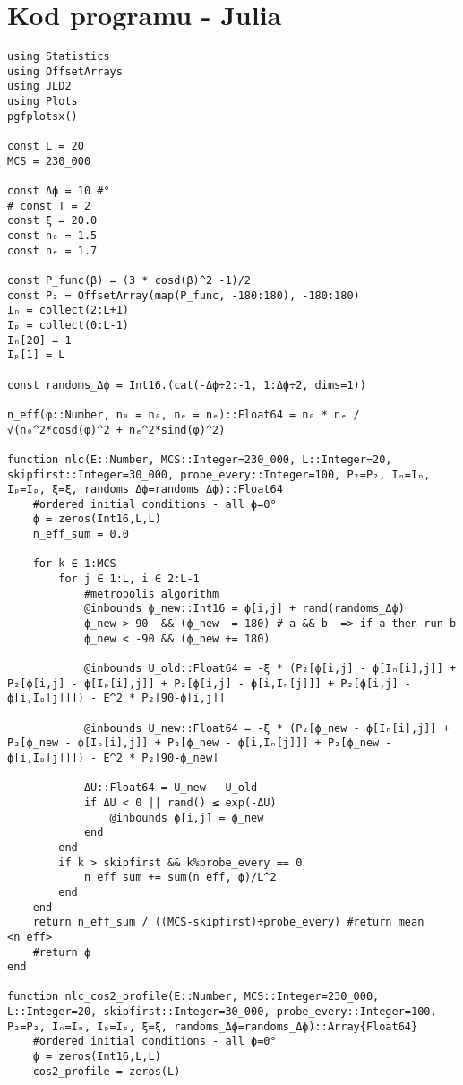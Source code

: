 \documentclass[11pt]{article}
\begin{document}
\section*{Kod programu - Julia}
\begin{verbatim}
using Statistics
using OffsetArrays
using JLD2
using Plots
pgfplotsx()

const L = 20
MCS = 230_000

const Δϕ = 10 #° 
# const T = 2
const ξ = 20.0
const n₀ = 1.5
const nₑ = 1.7

const P_func(β) = (3 * cosd(β)^2 -1)/2 
const P₂ = OffsetArray(map(P_func, -180:180), -180:180)
Iₙ = collect(2:L+1)
Iₚ = collect(0:L-1)
Iₙ[20] = 1
Iₚ[1] = L

const randoms_Δϕ = Int16.(cat(-Δϕ÷2:-1, 1:Δϕ÷2, dims=1))

n_eff(φ::Number, n₀ = n₀, nₑ = nₑ)::Float64 = n₀ * nₑ / √(n₀^2*cosd(φ)^2 + nₑ^2*sind(φ)^2)

function nlc(E::Number, MCS::Integer=230_000, L::Integer=20, skipfirst::Integer=30_000, probe_every::Integer=100, P₂=P₂, Iₙ=Iₙ, Iₚ=Iₚ, ξ=ξ, randoms_Δϕ=randoms_Δϕ)::Float64
    #ordered initial conditions - all ϕ=0°
    ϕ = zeros(Int16,L,L)
    n_eff_sum = 0.0

    for k ∈ 1:MCS
        for j ∈ 1:L, i ∈ 2:L-1
            #metropolis algorithm
            @inbounds ϕ_new::Int16 = ϕ[i,j] + rand(randoms_Δϕ)
            ϕ_new > 90  && (ϕ_new -= 180) # a && b  => if a then run b
            ϕ_new < -90 && (ϕ_new += 180)

            @inbounds U_old::Float64 = -ξ * (P₂[ϕ[i,j] - ϕ[Iₙ[i],j]] + P₂[ϕ[i,j] - ϕ[Iₚ[i],j]] + P₂[ϕ[i,j] - ϕ[i,Iₙ[j]]] + P₂[ϕ[i,j] - ϕ[i,Iₚ[j]]]) - E^2 * P₂[90-ϕ[i,j]]
            
            @inbounds U_new::Float64 = -ξ * (P₂[ϕ_new - ϕ[Iₙ[i],j]] + P₂[ϕ_new - ϕ[Iₚ[i],j]] + P₂[ϕ_new - ϕ[i,Iₙ[j]]] + P₂[ϕ_new - ϕ[i,Iₚ[j]]]) - E^2 * P₂[90-ϕ_new]

            ΔU::Float64 = U_new - U_old
            if ΔU < 0 || rand() ≤ exp(-ΔU)
                @inbounds ϕ[i,j] = ϕ_new
            end
        end
        if k > skipfirst && k%probe_every == 0
            n_eff_sum += sum(n_eff, ϕ)/L^2
        end
    end
    return n_eff_sum / ((MCS-skipfirst)÷probe_every) #return mean <n_eff>
    #return ϕ
end

function nlc_cos2_profile(E::Number, MCS::Integer=230_000, L::Integer=20, skipfirst::Integer=30_000, probe_every::Integer=100, P₂=P₂, Iₙ=Iₙ, Iₚ=Iₚ, ξ=ξ, randoms_Δϕ=randoms_Δϕ)::Array{Float64}
    #ordered initial conditions - all ϕ=0°
    ϕ = zeros(Int16,L,L)
    cos2_profile = zeros(L)


\end{verbatim}
\end{document}
